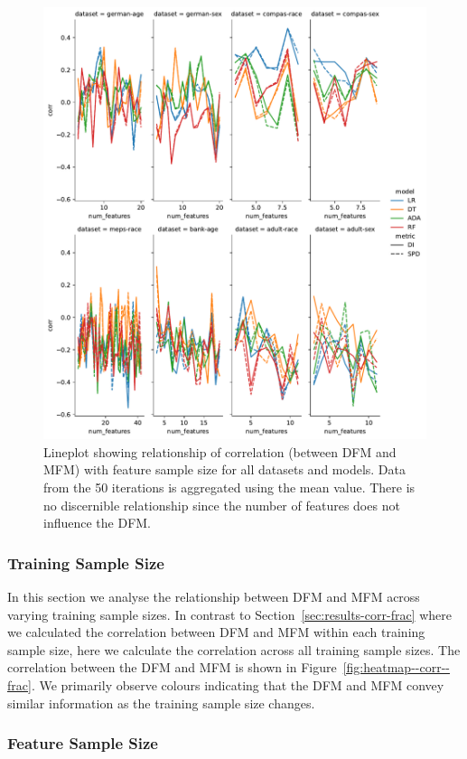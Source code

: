 \documentclass[sigconf]{acmart}
\begin{document}
\begin{figure}
  \centering
  \includegraphics[width=0.8\linewidth]{lineplot--num-features--corr.pdf}
  \caption{Lineplot showing relationship of correlation (between DFM
    and MFM) with feature sample size for all datasets and models.
    Data from the 50 iterations is aggregated using the mean value.
    There is no discernible relationship since the number of features
    does not influence the DFM.}
  \label{fig:lineplot--num-features--corr}
\end{figure}

\subsubsection{Training Sample Size}

In this section we analyse the relationship between DFM and MFM across
varying training sample sizes. In contrast to
Section \ref{sec:results-corr-frac} where we calculated the
correlation between DFM and MFM within each training sample size, here
we calculate the correlation across all training sample sizes. The
correlation between the DFM and MFM is shown in
Figure \ref{fig:heatmap--corr--frac}. We primarily observe colours
indicating that the DFM and MFM convey similar information as the
training sample size changes.

\subsubsection{Feature Sample Size}
\end{document}
